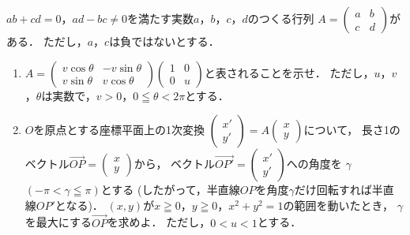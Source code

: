 \documentclass[../../main.tex]{subfiles}
\begin{document}
$ab+cd=0$，$ad-bc\neq0$を満たす実数$a$，$b$，$c$，$d$のつくる行列
$A=
\begin{pmatrix} a & b \\ c & d
\end{pmatrix}$がある．
ただし，$a$，$c$は負ではないとする．
\begin{enumerate}
  \item $A=
    \begin{pmatrix} v\cos\theta & -v\sin\theta \\ v\sin\theta & v\cos\theta
    \end{pmatrix}
    \begin{pmatrix} 1 & 0 \\ 0 & u
    \end{pmatrix}$と表されることを示せ．
    ただし，$u$，$v$，$\theta$は実数で，$v>0$，$0\leqq\theta<2\pi$とする．
  \item $O$を原点とする座標平面上の1次変換
    $
    \begin{pmatrix} x' \\ y'
    \end{pmatrix}=A
    \begin{pmatrix} x \\ y
    \end{pmatrix}$について，
    長さ1のベクトル$\overrightarrow{OP}=
    \begin{pmatrix} x \\ y
    \end{pmatrix}$から，
    ベクトル$\overrightarrow{OP'}=
    \begin{pmatrix} x' \\ y'
    \end{pmatrix}$への角度を
    $\gamma$ $(-\pi<\gamma\leqq\pi)$とする
    (したがって，半直線$OP$を角度$\gamma$だけ回転すれば半直線$OP'$となる)．
    $(x,y)$が$x\geqq0$，$y\geqq0$，$x^2+y^2=1$の範囲を動いたとき，
    $\gamma$を最大にする$\overrightarrow{OP}$を求めよ．
    ただし，$0<u<1$とする．
\end{enumerate}
\end{document}
